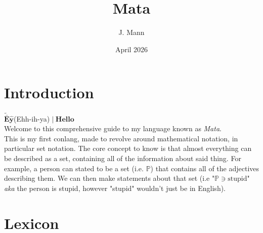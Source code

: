 \documentclass{article}
\title{Mata}
\author{J. Mann}
\date{April 2026}
\makeatletter
\newcommand{\mataHello}{\tilde{\bar{E}}\hat{y}}%
\renewcommand{\maketitle}{
  \begin{center}
  \topskip0pt
  \vspace*{20em}
    {\fontsize{144pt}{28pt}\selectfont \@title \par}
    \vspace{2em}
    {\fontsize{36pt}{16pt}\selectfont \@author \par}
    \vspace{5em}
    {\fontsize{36pt}{16pt}\selectfont \textbf \@headline \par}
    \vspace{2em}
    {\fontsize{24pt}{16pt}\selectfont \@subheadline \par}
    \vspace{\fill}
    {\fontsize{18pt}{14pt}\selectfont \@date \par}
  \vspace*{3em}
  \end{center}
}
\makeatother
\begin{document}
\begin{titlepage}
\maketitle
\end{titlepage}
\newpage
\pagestyle{fancy}
\rhead{}

\setcounter{section}{-1}
\section{Introduction}
\vspace{-0.5em}
{\fontsize{16pt}{12pt}\selectfont
$\mathbf{\mataHello}${\fontsize{8pt}{12pt}\selectfont(Ehh-ih-ya)} $\mathbf{|\ Hello}$
\vspace{0.2em}\\
Welcome to this comprehensive guide to my language known as \emph{Mata}.\\
This is my first conlang, made to revolve around mathematical notation, in particular set notation.
The core concept to know is that almost everything can be described as a set, containing all of the information about said thing. For example, a person can stated to be a set (i.e. $\mathbb{P}$) that contains all of the adjectives describing them. We can then make statements about that set (i.e "$\mathbb{P}\ni\text{stupid}$" \emph{aka} the person is stupid, however "stupid" wouldn't just be in English).
}
\newpage

\vspace{10em}
\section{Lexicon}
\end{document}
